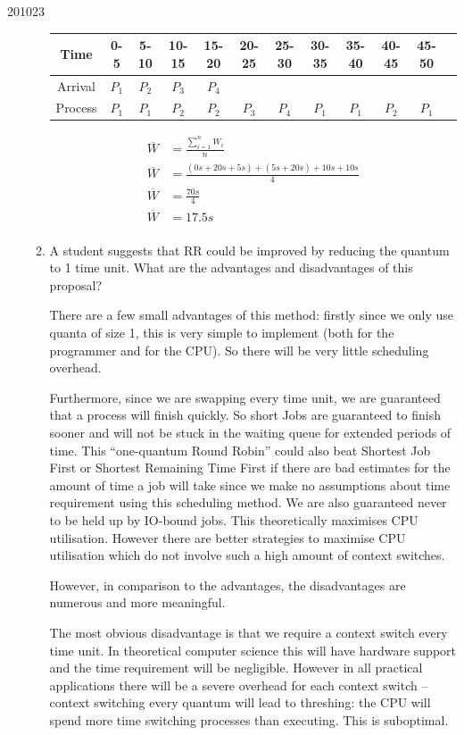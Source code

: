 \documentclass[10pt,\jkfside,a4paper]{article}
\begin{document}
\begin{examquestion}{2010}{2}{3}
\begin{enumerate}
\begin{enumerate}
\begin{tabular}{c|ccccccccccc}
Time & 0-5 & 5-10 & 10-15 & 15-20 & 20-25 & 25-30 & 30-35 & 35-40 & 40-45 & 45-50 \\
\hline
Arrival & $P_1$ & $P_2$ & $P_3$ & $P_4$ & & & & & \\
Process & $P_1$ & $P_1$ & $P_2$ & $P_2$ & $P_3$ & $P_4$ & $P_1$ & $P_1$ & $P_2$ & $P_1$ \\
\end{tabular}
\begin{equation*}
\begin{split}
\overline{W} &= \frac{\sum^n_{i=1} W_i}{n}\\
\overline{W} &= \frac{(0s + 20s + 5s) + (5s + 20s) + 10s + 10s}{4}\\
\overline{W} &= \frac{70s}{4}\\
\overline{W} &= 17.5s\\
\end{split}
\end{equation*}

\item A student suggests that RR could be improved by reducing the quantum
to 1 time unit. What are the advantages and disadvantages of this
proposal?

There are a few small advantages of this method: firstly since we only use quanta of size 1, 
this is very simple to implement (both for the programmer and for the CPU). So there will 
be very little scheduling overhead.

Furthermore, since we are swapping every time unit, we are guaranteed that a process will 
finish quickly. So short Jobs are guaranteed to finish sooner and will not be stuck in the 
waiting queue for extended periods of time. This ``one-quantum Round Robin'' could also 
beat Shortest Job First or Shortest Remaining Time First if there are bad estimates for 
the amount of time a job will take since we make no assumptions about time requirement 
using this scheduling method. We are also guaranteed never to be held up by IO-bound jobs. 
This theoretically maximises CPU utilisation. However there are better strategies to 
maximise CPU utilisation which do not involve such a high amount of context switches.

However, in comparison to the advantages, the disadvantages are numerous and more meaningful. 

The most obvious disadvantage is that we require a context switch every time unit. In 
theoretical computer science this will have hardware support and the time requirement 
will be negligible. However in all practical applications there will be a severe overhead 
for each context switch -- context switching every quantum will lead to threshing: the CPU 
will spend more time switching processes than executing. This is suboptimal.


\end{enumerate}
\end{enumerate}
\end{examquestion}
\end{document}
